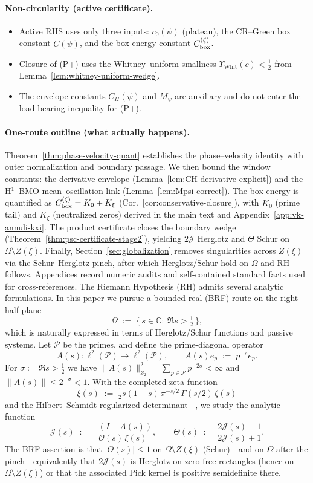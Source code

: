 \documentclass[11pt]{article}
\theoremstyle{definition}
\theoremstyle{remark}
\newcommand{\C}{\mathbb{C}}
\newcommand{\PP}{\mathcal{P}}
\newcommand{\HS}{\mathcal{S}_2}
\newcommand{\Half}{\{\,s\in\C:\ \Re s>\tfrac12\,\}}
\DeclareMathOperator{\dettwo}{det_2}
\begin{document}
\paragraph{Non-circularity (active certificate).}
\begin{itemize}
\item Active RHS uses only three inputs: $c_0(\psi)$ (plateau), the CR–Green box constant $C(\psi)$, and the box-energy constant $C_{\rm box}^{(\zeta)}$.
\item Closure of \textup{(P+)} uses the Whitney–uniform smallness $\Upsilon_{\mathrm{Whit}}(c)<\tfrac12$ from Lemma~\ref{lem:whitney-uniform-wedge}.
\item The envelope constants $C_H(\psi)$ and $M_\psi$ are auxiliary and do not enter the load-bearing inequality for (P+).
\end{itemize}

\paragraph{One-route outline (what actually happens).}
Theorem~\ref{thm:phase-velocity-quant} establishes the phase–velocity identity with outer normalization and boundary passage. We then bound the window constants: the derivative envelope (Lemma~\ref{lem:CH-derivative-explicit}) and the H$^1$–BMO mean–oscillation link (Lemma~\ref{lem:Mpsi-correct}). The box energy is quantified as $C_{\rm box}^{(\zeta)}=K_0+K_\xi$ (Cor.~\ref{cor:conservative-closure}), with $K_0$ (prime tail) and $K_\xi$ (neutralized zeros) derived in the main text and Appendix~\ref{app:vk-annuli-kxi}. The product certificate closes the boundary wedge (Theorem~\ref{thm:psc-certificate-stage2}), yielding $2\mathcal J$ Herglotz and $\Theta$ Schur on $\Omega\setminus Z(\xi)$. Finally, Section~\ref{sec:globalization} removes singularities across $Z(\xi)$ via the Schur–Herglotz pinch, after which Herglotz/Schur hold on $\Omega$ and RH follows. Appendices record numeric audits and self-contained standard facts used for cross-references.
The Riemann Hypothesis (RH) admits several analytic formulations. In this paper we pursue a bounded-real (BRF) route on the right half-plane
\[
 \Omega\;:=\;\Half,
\]
which is naturally expressed in terms of Herglotz/Schur functions and passive systems. Let \(\PP\) be the primes, and define the prime-diagonal operator
\[
 A(s):\ell^2(\PP)\to\ell^2(\PP),\qquad A(s)e_p\;:=\;p^{-s}e_p.
\]
For \(\sigma:=\Re s>\tfrac12\) we have \(\|A(s)\|_{\HS}^2=\sum_{p\in\PP}p^{-2\sigma}<\infty\) and \(\|A(s)\|\le 2^{-\sigma}<1\). With the completed zeta function
\[
 \xi(s)\;:=\;\tfrac12 s(1-s)\,\pi^{-s/2}\,\Gamma(s/2)\,\zeta(s)
\]
and the Hilbert--Schmidt regularized determinant \(\dettwo\), we study the analytic function
\[
 \mathcal J(s)\;:=\;\frac{\dettwo(I-A(s))}{\mathcal O(s)\,\xi(s)},\qquad \Theta(s)\;:=\;\frac{2\mathcal J(s)-1}{2\mathcal J(s)+1}.
\]
The BRF assertion is that \(|\Theta(s)|\le 1\) on $\Omega\setminus Z(\xi)$ (Schur)—and on $\Omega$ after the pinch—equivalently that $2\mathcal J(s)$ is Herglotz on zero-free rectangles (hence on $\Omega\setminus Z(\xi)$) or that the associated Pick kernel is positive semidefinite there.
\end{document}
